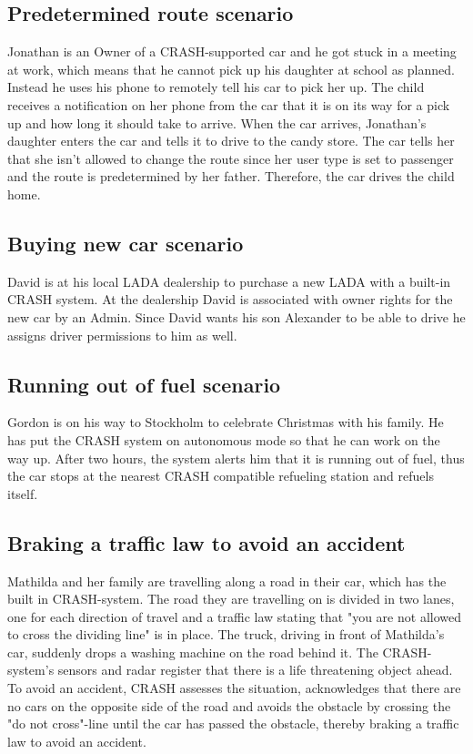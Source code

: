 \documentclass{article}
\begin{document}
\subsection {Predetermined route scenario}
\noindent Jonathan is an Owner of a CRASH-supported car and he got stuck in a meeting at work, which means that he cannot pick up his daughter at school as planned. Instead he uses his phone to remotely tell his car to pick her up. The child receives a notification on her phone from the car that it is on its way for a pick up and how long it should take to arrive. When the car arrives, Jonathan’s daughter enters the car and tells it to drive to the candy store. The car tells her that she isn't allowed to change the route since her user type is set to passenger and the route is predetermined by her father. Therefore, the car drives the child home.

\subsection {Buying new car scenario}
\noindent David is at his local LADA dealership to purchase a new LADA with a built-in CRASH system. At the dealership David is associated with owner rights for the new car by an Admin. Since David wants his son Alexander to be able to drive he assigns driver permissions to him as well.

\subsection {Running out of fuel scenario}
\noindent Gordon is on his way to Stockholm to celebrate Christmas with his family. He has put the CRASH system on autonomous mode so that he can work on the way up. After two hours, the system alerts him that it is running out of fuel, thus the car stops at the nearest CRASH compatible refueling station and refuels itself.

\subsection {Braking a traffic law to avoid an accident}
\noindent Mathilda and her family are travelling along a road in their car, which has the built in CRASH-system. The road they are travelling on is divided in two lanes, one for each direction of travel and a traffic law stating that "you are not allowed to cross the dividing line" is in place. The truck, driving in front of Mathilda's car, suddenly drops a washing machine on the road behind it. The CRASH-system's sensors and radar register that there is a life threatening object ahead. To avoid an accident, CRASH assesses the situation, acknowledges that there are no cars on the opposite side of the road and avoids the obstacle by crossing the "do not cross"-line until the car has passed the obstacle, thereby braking a traffic law to avoid an accident.
\end{document}
